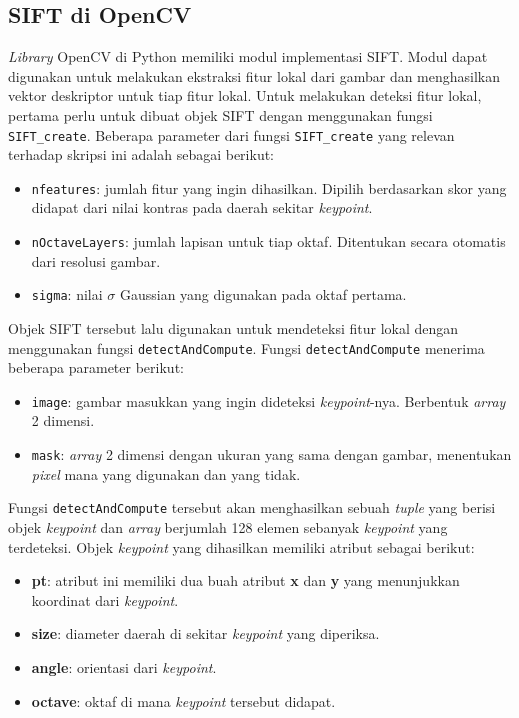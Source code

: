 \subsection{SIFT di OpenCV}
\textit{Library} OpenCV di Python memiliki modul implementasi SIFT. Modul dapat digunakan untuk melakukan ekstraksi fitur lokal dari gambar dan menghasilkan vektor deskriptor untuk tiap fitur lokal. Untuk melakukan deteksi fitur lokal, pertama perlu untuk dibuat objek SIFT dengan menggunakan fungsi \texttt{SIFT\_create}. Beberapa parameter dari fungsi \texttt{SIFT\_create} yang relevan terhadap skripsi ini adalah sebagai berikut:
\begin{itemize}
	\item \texttt{nfeatures}: jumlah fitur yang ingin dihasilkan. Dipilih berdasarkan skor yang didapat dari nilai kontras pada daerah sekitar \textit{keypoint}.
	\item \texttt{nOctaveLayers}: jumlah lapisan untuk tiap oktaf. Ditentukan secara otomatis dari resolusi gambar.
	\item \texttt{sigma}: nilai $\sigma$ Gaussian yang digunakan pada oktaf pertama.
\end{itemize}

Objek SIFT tersebut lalu digunakan untuk mendeteksi fitur lokal dengan menggunakan fungsi \texttt{detectAndCompute}. Fungsi \texttt{detectAndCompute} menerima beberapa parameter berikut:
\begin{itemize}
	\item \texttt{image}: gambar masukkan yang ingin dideteksi \textit{keypoint}-nya. Berbentuk \textit{array} 2 dimensi.
	\item \texttt{mask}: \textit{array} 2 dimensi dengan ukuran yang sama dengan gambar, menentukan \textit{pixel} mana yang digunakan dan yang tidak.
\end{itemize}

Fungsi \texttt{detectAndCompute} tersebut akan menghasilkan sebuah \textit{tuple} yang berisi objek \textit{keypoint} dan \textit{array} berjumlah 128 elemen sebanyak \textit{keypoint} yang terdeteksi. Objek \textit{keypoint} yang dihasilkan memiliki atribut sebagai berikut:
\begin{itemize}
	\item \textbf{pt}: atribut ini memiliki dua buah atribut \textbf{x} dan \textbf{y} yang menunjukkan koordinat dari \textit{keypoint}.
	\item \textbf{size}: diameter daerah di sekitar \textit{keypoint} yang diperiksa.
	\item \textbf{angle}: orientasi dari \textit{keypoint}.
	\item \textbf{octave}: oktaf di mana \textit{keypoint} tersebut didapat.
\end{itemize} 

